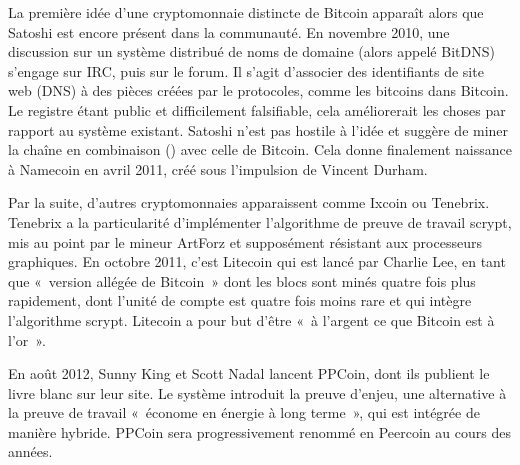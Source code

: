 La première idée d'une cryptomonnaie distincte de Bitcoin apparaît alors que Satoshi est encore présent dans la communauté. En novembre 2010, une discussion sur un système distribué de noms de domaine (alors appelé BitDNS) s'engage sur IRC, puis sur le forum. Il s'agit d'associer des identifiants de site web (DNS) à des pièces créées par le protocoles, comme les bitcoins dans Bitcoin. Le registre étant public et difficilement falsifiable, cela améliorerait les choses par rapport au système existant. Satoshi n'est pas hostile à l'idée et suggère de miner la chaîne en combinaison () avec celle de Bitcoin. Cela donne finalement naissance à Namecoin en avril 2011, créé sous l'impulsion de Vincent Durham.

Par la suite, d'autres cryptomonnaies apparaissent comme Ixcoin ou Tenebrix. Tenebrix a la particularité d'implémenter l'algorithme de preuve de travail scrypt, mis au point par le mineur ArtForz et supposément résistant aux processeurs graphiques. En octobre 2011, c'est Litecoin qui est lancé par Charlie Lee, en tant que «~version allégée de Bitcoin~» dont les blocs sont minés quatre fois plus rapidement, dont l'unité de compte est quatre fois moins rare et qui intègre l'algorithme scrypt. Litecoin a pour but d'être «~à l'argent ce que Bitcoin est à l'or~».

En août 2012, Sunny King et Scott Nadal lancent PPCoin, dont ils publient le livre blanc sur leur site. Le système introduit la preuve d'enjeu, une alternative à la preuve de travail «~économe en énergie à long terme~», qui est intégrée de manière hybride. PPCoin sera progressivement renommé en Peercoin au cours des années.

